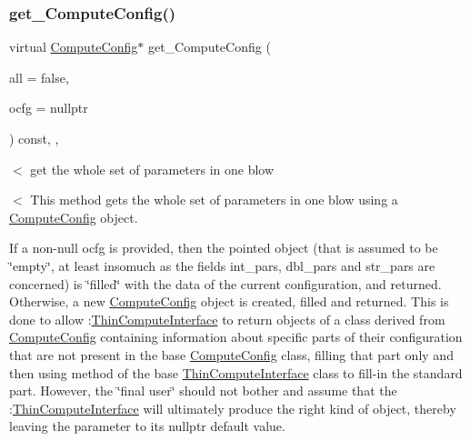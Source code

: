 \subsubsection{\texorpdfstring{get\+\_\+\+Compute\+Config()}{get\_ComputeConfig()}}
{\footnotesize\ttfamily virtual \mbox{\hyperlink{class_s_m_spp__di__unipi__it_1_1_compute_config}{Compute\+Config}}$\ast$ get\+\_\+\+Compute\+Config (\begin{DoxyParamCaption}\item[{bool}]{all = {\ttfamily false},  }\item[{\mbox{\hyperlink{class_s_m_spp__di__unipi__it_1_1_compute_config}{Compute\+Config}} $\ast$}]{ocfg = {\ttfamily nullptr} }\end{DoxyParamCaption}) const\hspace{0.3cm}{\ttfamily [inline]}, {\ttfamily [override]}, {\ttfamily [virtual]}}



$<$ get the whole set of parameters in one blow 

$<$ This method gets the whole set of parameters in one blow using a \mbox{\hyperlink{class_s_m_spp__di__unipi__it_1_1_compute_config}{Compute\+Config}} object.

If a non-\/null ocfg is provided, then the pointed object (that is assumed to be \char`\"{}empty\char`\"{}, at least insomuch as the fields int\+\_\+pars, dbl\+\_\+pars and str\+\_\+pars are concerned) is \char`\"{}filled\char`\"{} with the data of the current configuration, and returned. Otherwise, a new \mbox{\hyperlink{class_s_m_spp__di__unipi__it_1_1_compute_config}{Compute\+Config}} object is created, filled and returned. This is done to allow \+:\mbox{\hyperlink{class_s_m_spp__di__unipi__it_1_1_thin_compute_interface}{Thin\+Compute\+Interface}} to return objects of a class derived from \mbox{\hyperlink{class_s_m_spp__di__unipi__it_1_1_compute_config}{Compute\+Config}} containing information about specific parts of their configuration that are not present in the base \mbox{\hyperlink{class_s_m_spp__di__unipi__it_1_1_compute_config}{Compute\+Config}} class, filling that part only and then using method of the base \mbox{\hyperlink{class_s_m_spp__di__unipi__it_1_1_thin_compute_interface}{Thin\+Compute\+Interface}} class to fill-\/in the standard part. However, the \char`\"{}final user\char`\"{} should not bother and assume that the \+:\mbox{\hyperlink{class_s_m_spp__di__unipi__it_1_1_thin_compute_interface}{Thin\+Compute\+Interface}} will ultimately produce the right kind of object, thereby leaving the parameter to its nullptr default value.

